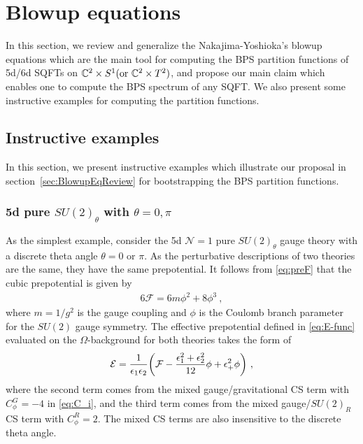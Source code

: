 \section{Blowup equations}\label{sec:BlowupEq}

In this section, we review and generalize the Nakajima-Yoshioka's blowup equations which are the main tool for computing the BPS partition functions of 5d/6d SQFTs on $\mathbb{C}^2\times S^1 ({\rm or~} \mathbb{C}^2\times T^2)$, and propose our main claim which enables one to compute the BPS spectrum of any SQFT. We also present some instructive examples for computing the partition functions.



\subsection{Instructive examples}\label{sec:instructive}

In this section, we present instructive examples which illustrate our proposal in section~\ref{sec:BlowupEqReview} for bootstrapping the BPS partition functions.

\subsubsection{5d pure \texorpdfstring{$SU(2)_\theta$}{SU2theta} with \texorpdfstring{$\theta=0,\pi$}{theta0pi}}

As the simplest example, consider the 5d $\mathcal{N}=1$ pure $SU(2)_\theta$ gauge theory with a discrete theta angle $ \theta = 0 $ or $ \pi $. As the perturbative descriptions of two theories are the same, they have the same prepotential. It follows from \eqref{eq:preF} that the cubic prepotential is given by
\begin{align}
6\mathcal{F}
= 6 m \phi^2+8\phi^3 \ ,
\end{align}
where $ m= 1/g^2 $ is the gauge coupling and $\phi$ is the Coulomb branch parameter for the $SU(2)$ gauge symmetry. The effective prepotential defined in \eqref{eq:E-func} evaluated on the $\Omega$-background for both theories takes the form of
\begin{align}
\mathcal{E}
= \frac{1}{\epsilon_1 \epsilon_2} \qty(\mathcal{F} - \frac{\epsilon_1^2  + \epsilon_2^2}{12}\phi+\epsilon_+^2 \phi) \ ,
\end{align}
where the second term comes from the mixed gauge/gravitational CS term with $C^G_\phi=-4$ in \eqref{eq:C_i}, and the third term comes from the mixed gauge/$SU(2)_R$ CS term with $C^R_\phi=2$. The mixed CS terms are also insensitive to the discrete theta angle.


